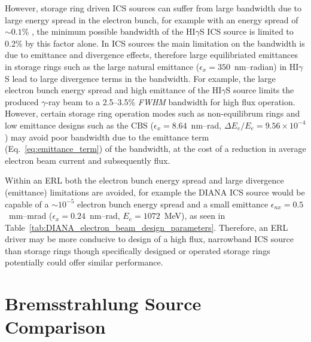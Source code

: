 \documentclass[../main.tex]{subfiles}
\begin{document}
However, storage ring driven ICS sources can suffer from large bandwidth due to large energy spread in the electron bunch, for example with an energy spread of $\sim0.1$\% \cite{litvinenko1996intense}, the minimum possible bandwidth of the HI$\gamma$S ICS source is limited to 0.2\% by this factor alone. In ICS sources the main limitation on the bandwidth is due to emittance and divergence effects, therefore large equilibriated emittances in storage rings such as the large natural emittance ($\epsilon_{x} = 350$~\si{\nano\meter}--\si{radian}) in HI$\gamma$S \cite{weller2009research} lead to large divergence terms in the bandwidth. For example, the large electron bunch energy spread and high emittance of the HI$\gamma$S source limits the produced $\gamma$-ray beam to a 2.5--3.5\% \textit{FWHM} bandwidth \cite{weller2009research} for high flux operation. However, certain storage ring operation modes such as non-equilibrum rings \cite{huang1998laser,owen2013nonequilibrium} and low emittance designs such as the CBS \cite{pan2019design} ($\epsilon_{x} = 8.64$~\si{\nano\meter}--\si{\radian}, $\Delta E_{e}/E_{e} = 9.56\times 10^{-4}$) may avoid poor bandwidth due to the emittance term (Eq.~\ref{eq:emittance_term}) of the bandwidth, at the cost of a reduction in average electron beam current and subsequently flux.     

Within an ERL both the electron bunch energy spread and large divergence (emittance) limitations are avoided, for example the DIANA ICS source would be capable of a $\sim10^{-5}$ electron bunch energy spread and a small emittance $\epsilon_{nx} = 0.5$~\si{\milli\meter}--\si{\milli\radian} ($\epsilon_{x} = 0.24$~\si{\nano\meter}--\si{\radian}, $E_{e} = 1072$~\si{\mega\electronvolt}), as seen in Table~\ref{tab:DIANA_electron_beam_design_parameters}. Therefore, an ERL driver may be more conducive to design of a high flux, narrowband ICS source than storage rings though specifically designed or operated storage rings potentially could offer similar performance.

\section{Bremsstrahlung Source Comparison}
\label{sec:bremsstrahlung_comparison}
\end{document}
